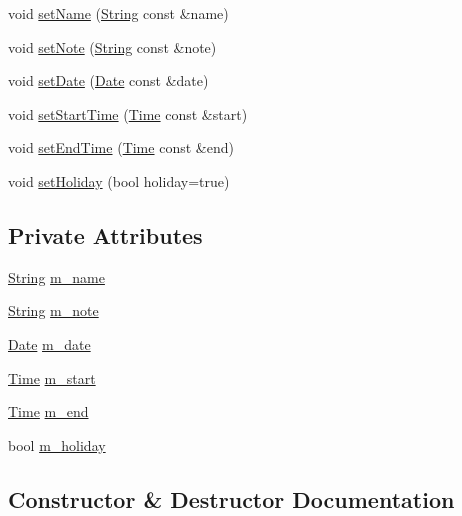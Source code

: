 \begin{DoxyCompactItemize}
void \hyperlink{classAppointment_a65ff6f9a246d1bf437cb0be725841a84}{set\+Name} (\hyperlink{classString}{String} const \&name)
\item 
void \hyperlink{classAppointment_a367bc61167a71691ba150808968f3b8c}{set\+Note} (\hyperlink{classString}{String} const \&note)
\item 
void \hyperlink{classAppointment_a0a69e652f7d3fa5091330a92479749a6}{set\+Date} (\hyperlink{classDate}{Date} const \&date)
\item 
void \hyperlink{classAppointment_ae0e33915a3e3d3af95c7e6180809e5fe}{set\+Start\+Time} (\hyperlink{classTime}{Time} const \&start)
\item 
void \hyperlink{classAppointment_a9e6455381eebacbaa3aa98ad3707baac}{set\+End\+Time} (\hyperlink{classTime}{Time} const \&end)
\item 
void \hyperlink{classAppointment_acd825ab9b1d23efe1bc95dd440030094}{set\+Holiday} (bool holiday=true)
\end{DoxyCompactItemize}
\subsection*{Private Attributes}
\begin{DoxyCompactItemize}
\item 
\hyperlink{classString}{String} \hyperlink{classAppointment_aa3d8a2e3194a6b785b26f7c31a208462}{m\+\_\+name}
\item 
\hyperlink{classString}{String} \hyperlink{classAppointment_a048a5e8081bcdccf2cffa725bcbe91b3}{m\+\_\+note}
\item 
\hyperlink{classDate}{Date} \hyperlink{classAppointment_a0bba9cd4c7e3e9ca7d8faae5726b3a5d}{m\+\_\+date}
\item 
\hyperlink{classTime}{Time} \hyperlink{classAppointment_a637a7ec86fc906086d1a3feb69533dbf}{m\+\_\+start}
\item 
\hyperlink{classTime}{Time} \hyperlink{classAppointment_a95319a7575e4a9d428412868b7625544}{m\+\_\+end}
\item 
bool \hyperlink{classAppointment_ada4f060e6014bcce3f8e5f42cd14061d}{m\+\_\+holiday}
\end{DoxyCompactItemize}


\subsection{Constructor \& Destructor Documentation}
\mbox{\label{classAppointment_a6f5ebbe07e02feaab6600c0f6297e694}} 
